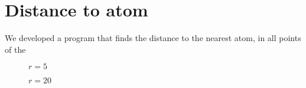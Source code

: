 \section{Distance to atom}
We developed a program that finds the distance to the nearest atom, in all points of the 
%
\setlength{\myfigwidth}{0.90\textwidth}%
\begin{figure}[htpb]%
    \centering%
    \caption{$r = 5$ \Ang}%
    \label{fig:distance_to_atom_r05}%
\end{figure}%
%
\begin{figure}[htpb]%
    \centering%
    \caption{$r = 20$ \Ang}%
    \label{fig:distance_to_atom_r20}%
\end{figure}%